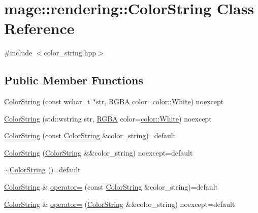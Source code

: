 \hypertarget{classmage_1_1rendering_1_1_color_string}{}\section{mage\+:\+:rendering\+:\+:Color\+String Class Reference}
\label{classmage_1_1rendering_1_1_color_string}


{\ttfamily \#include $<$color\+\_\+string.\+hpp$>$}

\subsection*{Public Member Functions}
\begin{DoxyCompactItemize}
\item 
\mbox{\hyperlink{classmage_1_1rendering_1_1_color_string_a17c74901fb2225c01f037caecc31f322}{Color\+String}} (const wchar\+\_\+t $\ast$str, \mbox{\hyperlink{structmage_1_1_r_g_b_a}{R\+G\+BA}} color=\mbox{\hyperlink{namespacemage_1_1color_a39aae61faf172a41b44e2d308e1e4da6}{color\+::\+White}}) noexcept
\item 
\mbox{\hyperlink{classmage_1_1rendering_1_1_color_string_abac2eac876023c3e4d5d4b28c0f72933}{Color\+String}} (std\+::wstring str, \mbox{\hyperlink{structmage_1_1_r_g_b_a}{R\+G\+BA}} color=\mbox{\hyperlink{namespacemage_1_1color_a39aae61faf172a41b44e2d308e1e4da6}{color\+::\+White}}) noexcept
\item 
\mbox{\hyperlink{classmage_1_1rendering_1_1_color_string_a386454b4a8e08707e8ffff8451509de5}{Color\+String}} (const \mbox{\hyperlink{classmage_1_1rendering_1_1_color_string}{Color\+String}} \&color\+\_\+string)=default
\item 
\mbox{\hyperlink{classmage_1_1rendering_1_1_color_string_a642793608186e9ac9931827ae9f0c57a}{Color\+String}} (\mbox{\hyperlink{classmage_1_1rendering_1_1_color_string}{Color\+String}} \&\&color\+\_\+string) noexcept=default
\item 
\mbox{\hyperlink{classmage_1_1rendering_1_1_color_string_a13ab2218e1cbe99241283214e455f3c9}{$\sim$\+Color\+String}} ()=default
\item 
\mbox{\hyperlink{classmage_1_1rendering_1_1_color_string}{Color\+String}} \& \mbox{\hyperlink{classmage_1_1rendering_1_1_color_string_ab42304d36628f21263a4d545831b3829}{operator=}} (const \mbox{\hyperlink{classmage_1_1rendering_1_1_color_string}{Color\+String}} \&color\+\_\+string)=default
\item 
\mbox{\hyperlink{classmage_1_1rendering_1_1_color_string}{Color\+String}} \& \mbox{\hyperlink{classmage_1_1rendering_1_1_color_string_aa70b60e0c8528306e7473ee0b5bfbe03}{operator=}} (\mbox{\hyperlink{classmage_1_1rendering_1_1_color_string}{Color\+String}} \&\&color\+\_\+string) noexcept=default

\end{DoxyCompactItemize}
